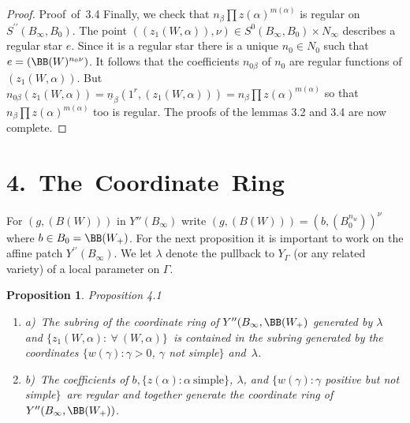 \documentclass{memo-l}
\newtheorem{proposition}[theorem]{Proposition}
\theoremstyle{definition}
\theoremstyle{remark}
\numberwithin{section}{chapter}
\numberwithin{equation}{chapter}
\begin{document}
\begin{proof} {Proof\ of\ 3.4}
Finally, we check that $n_{{\beta}} \prod z({\alpha})^{m({\alpha})}$ 
is regular on $S^{\prime\prime}(B_{{\infty}},B_{0})$. 
The point 
\newline 
$((z_{1}(W,{\alpha})),{\nu}) \in S^{0}(B_{{\infty}},B_{0}) 
\times N_{{\infty}}$ describes a regular star $e$. 
 Since it is a regular star there is a unique $n_0 \in N_{0}$ such that 
$e = ({\BB}(W)^{n_0\nu})$. 
 It follows that the coefficients $n_{0\beta}$ of $n_0$ are regular 
functions of $(z_{1}(W,{\alpha}))$. 
 But $n_{0\beta}(z_{1}(W,{\alpha})) = \underline{n}_{{\beta}}(1^r,
(z_{1}(W,{\alpha}))) = n_{{\beta}} \prod z({\alpha})^{m({\alpha})}$ 
so that $n_{{\beta}} \prod z({\alpha})^{m({\alpha})}$ too is regular. 
 The proofs of the lemmas 3.2 and 3.4 are now complete. 
 \end{proof} 

\section{4.\ The\ Coordinate\ Ring}

   For $(g,(B(W)))$ in $Y''(B_{{\infty}})$ write $(g,(B(W))) = 
(b,(B_{0}^{n_w}))^\nu$  where $b \in B_{0}={\BB}(W_{+})$. 
 For the next proposition it is important to work on the affine patch 
$Y^{\prime\prime}(B_{{\infty}})$.  We let $\lambda$ denote the pullback
to $Y_\Gamma$ (or any related variety) of a local parameter on $\Gamma$.

\medpagebreak

\begin{proposition}{Proposition  4.1}   
\begin{enumerate}
\item{a)}\   The subring of the coordinate ring of $Y^{\prime\prime}(B_\infty,\BB(W_+)$
generated by $\lambda$ and $\{z_{1}(W,{\alpha}): \ \forall\
(W,\alpha)\}$\ is contained in the subring generated by the 
coordinates $\{w({\gamma}) : {\gamma} > 0$, ${\gamma}$ not simple$\}$
and\ ${\lambda}$.
\item{b)}\  The coefficients of $b, \{z({\alpha}):{\alpha}\ {\text{simple}}\}$, 
${\lambda}$, 
and $\{w({\gamma}):{\gamma}$ positive but not simple$\}$\ are regular and together generate 
the coordinate ring of \hfil\break $Y''(B_{{\infty}},{\BB}(W_{+}))$.
\end{enumerate}
\end{proposition}
\end{document}
